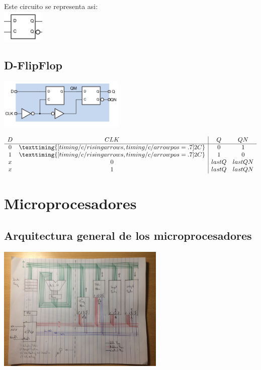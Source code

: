 \documentclass{report}
\begin{document}
Este circuito se representa asi: \\
\includegraphics[width=2cm]{../Assets/latch-d-rep.png}

\section{D-FlipFlop}

\includegraphics[width=6cm]{../Assets/d-flipflop.png}

$\begin{array}{cc|cc}
		D & CLK                                                                & Q     & QN     \\ \hline
		0 & \texttiming{[timing/c/rising arrows,timing/c/arrow pos =.7]{2{C}}} & 0     & 1      \\ %
		1 & \texttiming{[timing/c/rising arrows,timing/c/arrow pos =.7]{2{C}}} & 1     & 0      \\
		x & 0                                                                  & lastQ & lastQN \\
		x & 1                                                                  & lastQ & lastQN \\
	\end{array}$

\chapter{Microprocesadores}
\section{Arquitectura general de los microprocesadores}
\includegraphics[width=8cm]{../Assets/arquitectura_general_uP.JPG}
\end{document}
